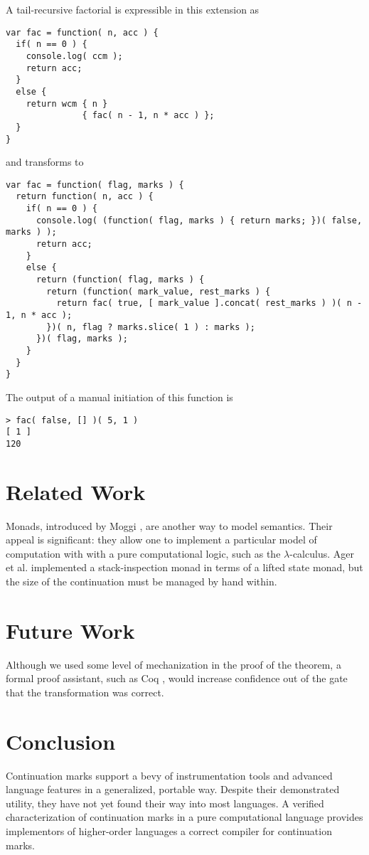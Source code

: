 \documentclass{llncs}
\newcommand{\lc}[0]{$\lambda$-calculus}
\begin{document}
A tail-recursive factorial is expressible in this extension as
\begin{verbatim}
var fac = function( n, acc ) {
  if( n == 0 ) {
    console.log( ccm );
    return acc;
  }
  else {
    return wcm { n }
               { fac( n - 1, n * acc ) };
  }
}
\end{verbatim}
and transforms to
\begin{verbatim}
var fac = function( flag, marks ) {
  return function( n, acc ) {
    if( n == 0 ) {
      console.log( (function( flag, marks ) { return marks; })( false, marks ) );
      return acc;
    }
    else {
      return (function( flag, marks ) {
        return (function( mark_value, rest_marks ) {
          return fac( true, [ mark_value ].concat( rest_marks ) )( n - 1, n * acc );
        })( n, flag ? marks.slice( 1 ) : marks );
      })( flag, marks );
    }
  }
}
\end{verbatim}

The output of a manual initiation of this function is
\begin{verbatim}
> fac( false, [] )( 5, 1 )
[ 1 ]
120
\end{verbatim}

\section{Related Work}

Monads, introduced by Moggi \cite{moggi1989computational}, are another way to model semantics. Their appeal is significant: they allow one to implement a particular model of computation with with a pure computational logic, such as the \lc. Ager et al. \cite{ager2003functional} implemented a stack-inspection monad in terms of a lifted state monad, but the size of the continuation must be managed by hand within.

\section{Future Work}

Although we used some level of mechanization in the proof of the theorem, a formal proof assistant, such as Coq \cite{barras1997coq}, would increase confidence out of the gate that the transformation was correct.

\section{Conclusion}

Continuation marks support a bevy of instrumentation tools and advanced language features in a generalized, portable way. Despite their demonstrated utility, they have not yet found their way into most languages. A verified characterization of continuation marks in a pure computational language provides implementors of higher-order languages a correct compiler for continuation marks.



\end{document}
